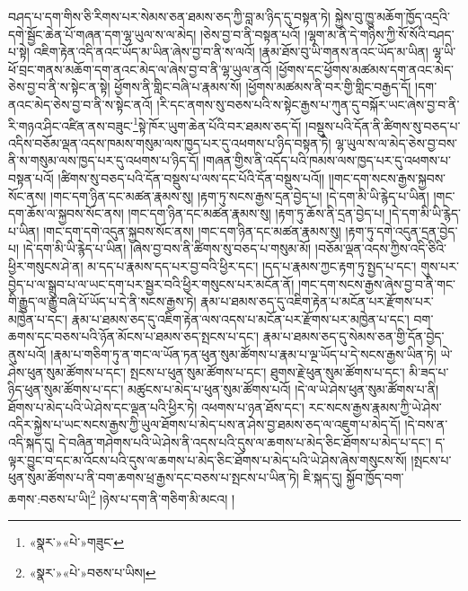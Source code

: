 བཤད་པ་དག་གིས་ཅི་རིགས་པར་སེམས་ཅན་ཐམས་ཅད་ཀྱི་བླ་མ་ཉིད་དུ་བསྟན་ཏེ། སྐྱེས་བུ་ཁྱུ་མཆོག་ཁྱོད་འདྲའི་དགེ་སྦྱོང་ཆེན་པོ་གཞན་དག་ལྷ་ཡུལ་ས་ལ་མེད། །ཅེས་བྱ་བ་ནི་བསྟན་པའོ། །ལྷག་མ་ནི་དེ་གཉིས་ཀྱི་སོ་སོའི་བཤད་པ་སྟེ། འཇིག་རྟེན་འདི་ནའང་ཡོད་མ་ཡིན་ཞེས་བྱ་བ་ནི་ས་ལའོ། །རྣམ་ཐོས་བུ་ཡི་གནས་ནའང་ཡོད་མ་ཡིན། ལྷ་ཡི་ཕོ་བྲང་གནས་མཆོག་དག་ནའང་མེད་ལ་ཞེས་བྱ་བ་ནི་ལྷ་ཡུལ་ནའོ། །ཕྱོགས་དང་ཕྱོགས་མཚམས་དག་ནའང་མེད་ཅེས་བྱ་བ་ནི་ས་སྟེང་ན་སྟེ། ཕྱོགས་ནི་གླིང་བཞི་པ་རྣམས་སོ། །ཕྱོགས་མཚམས་ནི་བར་གྱི་གླིང་བརྒྱད་དོ། །དག་ནའང་མེད་ཅེས་བྱ་བ་ནི་ས་སྟེང་ནའོ། །རི་དང་ནགས་སུ་བཅས་པའི་ས་སྟེང་རྒྱས་པ་ཀུན་དུ་བསྐོར་ཡང་ཞེས་བྱ་བ་ནི་རི་གཉའ་ཤིང་འཛིན་ནས་བཟུང་\footnote{«སྣར་»«པེ་»གཟུང་}སྟེ་ཁོར་ཡུག་ཆེན་པོའི་བར་ཐམས་ཅད་དོ། །བསྡུས་པའི་དོན་ནི་ཚིགས་སུ་བཅད་པ་འདིས་བཅོམ་ལྡན་འདས་ཁམས་གསུམ་ལས་ཁྱད་པར་དུ་འཕགས་པ་ཉིད་བསྟན་ཏེ། ལྷ་ཡུལ་ས་ལ་མེད་ཅེས་བྱ་བས་ནི་ས་གསུམ་ལས་ཁྱད་པར་དུ་འཕགས་པ་ཉིད་དོ། །གཞན་གྱིས་ནི་འདོད་པའི་ཁམས་ལས་ཁྱད་པར་དུ་འཕགས་པ་བསྟན་པའོ། །ཚིགས་སུ་བཅད་པའི་དོན་བསྡུས་པ་ལས་དང་པོའི་དོན་བསྡུས་པའོ།། །།གང་དག་སངས་རྒྱས་སྐྱབས་སོང་ནས། །གང་དག་ཉིན་དང་མཚན་རྣམས་སུ། །རྟག་ཏུ་སངས་རྒྱས་དྲན་བྱེད་པ། །དེ་དག་མི་ཡི་རྙེད་པ་ཡིན། །གང་དག་ཆོས་ལ་སྐྱབས་སོང་ནས། །གང་དག་ཉིན་དང་མཚན་རྣམས་སུ། །རྟག་ཏུ་ཆོས་ནི་དྲན་བྱེད་པ། །དེ་དག་མི་ཡི་རྙེད་པ་ཡིན། །གང་དག་དགེ་འདུན་སྐྱབས་སོང་ནས། །གང་དག་ཉིན་དང་མཚན་རྣམས་སུ། །རྟག་ཏུ་དགེ་འདུན་དྲན་བྱེད་པ། །དེ་དག་མི་ཡི་རྙེད་པ་ཡིན། །ཞེས་བྱ་བས་ནི་ཚིགས་སུ་བཅད་པ་གསུམ་མོ། །བཅོམ་ལྡན་འདས་ཀྱིས་འདི་ཅིའི་ཕྱིར་གསུངས་ཤེ་ན། མ་དད་པ་རྣམས་དད་པར་བྱ་བའི་ཕྱིར་དང་། །དད་པ་རྣམས་ཀྱང་རྟག་ཏུ་སྤྱད་པ་དང་། གུས་པར་བྱེད་པ་ལ་སྒྲུབ་པ་ལ་ཡང་དག་པར་སྦྱར་བའི་ཕྱིར་གསུངས་པར་མངོན་ནོ། །གང་དག་སངས་རྒྱས་ཞེས་བྱ་བ་ནི་གང་གི་རྒྱུད་ལ་རྒྱུ་བཞི་པོ་ཡོད་པ་དེ་ནི་སངས་རྒྱས་ཏེ། རྣམ་པ་ཐམས་ཅད་དུ་འཇིག་རྟེན་པ་མངོན་པར་རྫོགས་པར་མཁྱེན་པ་དང་། རྣམ་པ་ཐམས་ཅད་དུ་འཇིག་རྟེན་ལས་འདས་པ་མངོན་པར་རྫོགས་པར་མཁྱེན་པ་དང་། བག་ཆགས་དང་བཅས་པའི་ཉོན་མོངས་པ་ཐམས་ཅད་སྤངས་པ་དང་། རྣམ་པ་ཐམས་ཅད་དུ་སེམས་ཅན་གྱི་དོན་བྱེད་ནུས་པའོ། །རྣམ་པ་གཅིག་ཏུ་ན་གང་ལ་ཡོན་ཏན་ཕུན་སུམ་ཚོགས་པ་རྣམ་པ་ལྔ་ཡོད་པ་དེ་སངས་རྒྱས་ཡིན་ཏེ། ཡེ་ཤེས་ཕུན་སུམ་ཚོགས་པ་དང་། སྤངས་པ་ཕུན་སུམ་ཚོགས་པ་དང་། ཐུགས་རྗེ་ཕུན་སུམ་ཚོགས་པ་དང་། མི་ཟད་པ་ཉིད་ཕུན་སུམ་ཚོགས་པ་དང་། མཚུངས་པ་མེད་པ་ཕུན་སུམ་ཚོགས་པའོ། །དེ་ལ་ཡེ་ཤེས་ཕུན་སུམ་ཚོགས་པ་ནི། ཐོགས་པ་མེད་པའི་ཡེ་ཤེས་དང་ལྡན་པའི་ཕྱིར་ཏེ། འཕགས་པ་ཉན་ཐོས་དང་། རང་སངས་རྒྱས་རྣམས་ཀྱི་ཡེ་ཤེས་འདིར་སྐྱེས་པ་ཡང་སངས་རྒྱས་ཀྱི་ཡུལ་ཐོགས་པ་མེད་པས་ན་ཤེས་བྱ་ཐམས་ཅད་ལ་འཇུག་པ་མེད་དོ། །དེ་བས་ན་འདི་སྐད་དུ། དེ་བཞིན་གཤེགས་པའི་ཡེ་ཤེས་ནི་འདས་པའི་དུས་ལ་ཆགས་པ་མེད་ཅིང་ཐོགས་པ་མེད་པ་དང་། ད་ལྟར་བྱུང་བ་དང་མ་འོངས་པའི་དུས་ལ་ཆགས་པ་མེད་ཅིང་ཐོགས་པ་མེད་པའི་ཡེ་ཤེས་ཞེས་གསུངས་སོ། །སྤངས་པ་ཕུན་སུམ་ཚོགས་པ་ནི་བག་ཆགས་ཕྲ་རྒྱས་དང་བཅས་པ་སྤངས་པ་ཡིན་ཏེ། ཇི་སྐད་དུ། སྐྱོབ་ཁྱོད་བག་ཆགས་:བཅས་པ་ཡི།\footnote{«སྣར་»«པེ་»བཅས་པ་ཡིས།} །ཉེས་པ་དག་ནི་གཅིག་མི་མངའ། །
